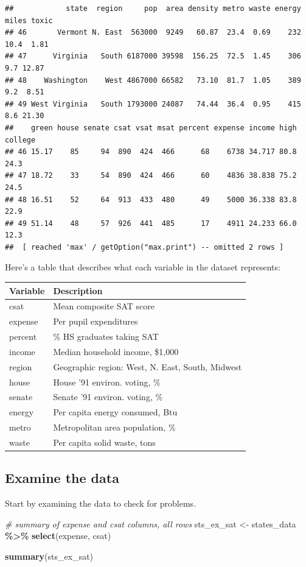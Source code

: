\documentclass[
]{book}
\newenvironment{Shaded}{\begin{snugshade}}{\end{snugshade}}
\newcommand{\CommentTok}[1]{\textcolor[rgb]{0.56,0.35,0.01}{\textit{#1}}}
\newcommand{\KeywordTok}[1]{\textcolor[rgb]{0.13,0.29,0.53}{\textbf{#1}}}
\newcommand{\NormalTok}[1]{#1}
\newcommand{\OperatorTok}[1]{\textcolor[rgb]{0.81,0.36,0.00}{\textbf{#1}}}
\newcommand{\StringTok}[1]{\textcolor[rgb]{0.31,0.60,0.02}{#1}}
\begin{document}
\begin{verbatim}
##            state  region     pop  area density metro waste energy miles toxic
## 46       Vermont N. East  563000  9249   60.87  23.4  0.69    232  10.4  1.81
## 47      Virginia   South 6187000 39598  156.25  72.5  1.45    306   9.7 12.87
## 48    Washington    West 4867000 66582   73.10  81.7  1.05    389   9.2  8.51
## 49 West Virginia   South 1793000 24087   74.44  36.4  0.95    415   8.6 21.30
##    green house senate csat vsat msat percent expense income high college
## 46 15.17    85     94  890  424  466      68    6738 34.717 80.8    24.3
## 47 18.72    33     54  890  424  466      60    4836 38.838 75.2    24.5
## 48 16.51    52     64  913  433  480      49    5000 36.338 83.8    22.9
## 49 51.14    48     57  926  441  485      17    4911 24.233 66.0    12.3
##  [ reached 'max' / getOption("max.print") -- omitted 2 rows ]
\end{verbatim}

Here's a table that describes what each variable in the dataset represents:

\begin{longtable}[]{@{}ll@{}}
\toprule
Variable & Description\tabularnewline
\midrule
\endhead
csat & Mean composite SAT score\tabularnewline
expense & Per pupil expenditures\tabularnewline
percent & \% HS graduates taking SAT\tabularnewline
income & Median household income, \$1,000\tabularnewline
region & Geographic region: West, N. East, South, Midwest\tabularnewline
house & House '91 environ. voting, \%\tabularnewline
senate & Senate '91 environ. voting, \%\tabularnewline
energy & Per capita energy consumed, Btu\tabularnewline
metro & Metropolitan area population, \%\tabularnewline
waste & Per capita solid waste, tons\tabularnewline
\bottomrule
\end{longtable}

\hypertarget{examine-the-data}{%
\subsection{Examine the data}\label{examine-the-data}}

Start by examining the data to check for problems.

\begin{Shaded}
\begin{Highlighting}[]
  \CommentTok{\# summary of expense and csat columns, all rows}
\NormalTok{  sts\_ex\_sat \textless{}{-}}\StringTok{ }
\StringTok{      }\NormalTok{states\_data }\OperatorTok{\%\textgreater{}\%}\StringTok{ }
\StringTok{      }\KeywordTok{select}\NormalTok{(expense, csat)}
  
  \KeywordTok{summary}\NormalTok{(sts\_ex\_sat)}
\end{Highlighting}
\end{Shaded}
\end{document}
